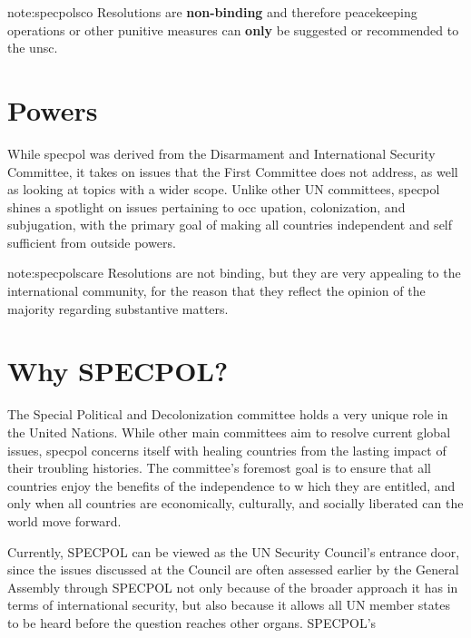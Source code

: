 \begin{note}{note:specpolsco}
Resolutions are \textbf{non-binding} and therefore peacekeeping operations or other punitive measures can \textbf{only} be suggested or recommended to the \acrfull{unsc}.
\end{note}

\section{Powers}
While \acrshort{specpol} was derived from the Disarmament and 
International Security Committee, it takes on issues that the First Committee does not address, as 
well as looking at topics with a wider scope.
Unlike other UN committees, \acrshort{specpol}
shines a spotlight on issues pertaining to occ
upation, colonization, and subjugation, with the primary goal of making all countries independent and self
sufficient from outside powers.

\begin{note}{note:specpolscare}
Resolutions are not binding, but they are very appealing to the international community, for the reason that they reflect the opinion of the majority regarding substantive matters.
\end{note}
\section{Why SPECPOL?}
The Special Political and Decolonization committee holds a very unique role in the United Nations. 
While other main committees aim to resolve current global issues, \acrshort{specpol} concerns itself with 
healing countries from the lasting impact of their troubling histories. The committee’s foremost goal is to ensure that all countries enjoy the benefits of the independence to w
hich they are entitled, and only when all countries are economically, culturally, and socially liberated can the world move forward.


Currently, SPECPOL can be viewed as the UN Security Council’s entrance door, since the issues discussed at the Council are often assessed earlier by the General Assembly through SPECPOL not only because of the broader approach it has in terms of international security, but also because it allows all UN member states to be heard before the question reaches other organs. 
SPECPOL’s 